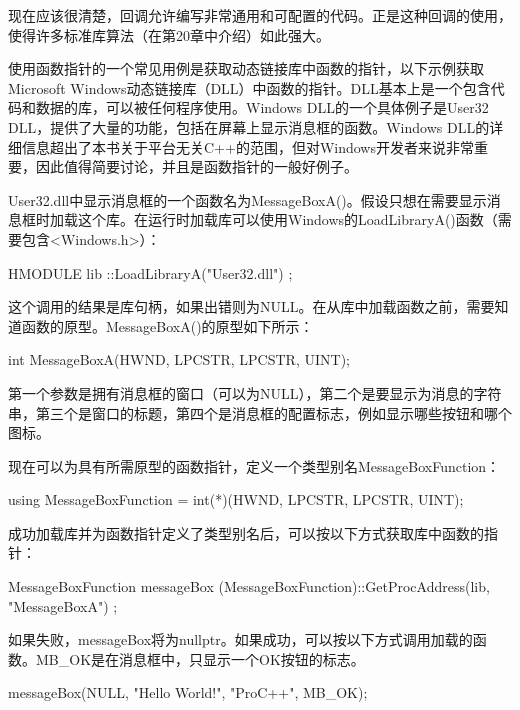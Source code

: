 现在应该很清楚，回调允许编写非常通用和可配置的代码。正是这种回调的使用，使得许多标准库算法（在第20章中介绍）如此强大。


使用函数指针的一个常见用例是获取动态链接库中函数的指针，以下示例获取Microsoft Windows动态链接库（DLL）中函数的指针。DLL基本上是一个包含代码和数据的库，可以被任何程序使用。Windows DLL的一个具体例子是User32 DLL，提供了大量的功能，包括在屏幕上显示消息框的函数。Windows DLL的详细信息超出了本书关于平台无关C++的范围，但对Windows开发者来说非常重要，因此值得简要讨论，并且是函数指针的一般好例子。

User32.dll中显示消息框的一个函数名为MessageBoxA()。假设只想在需要显示消息框时加载这个库。在运行时加载库可以使用Windows的LoadLibraryA()函数（需要包含<Windows.h>）：

\begin{cpp}
HMODULE lib { ::LoadLibraryA("User32.dll") };
\end{cpp}

这个调用的结果是库句柄，如果出错则为NULL。在从库中加载函数之前，需要知道函数的原型。MessageBoxA()的原型如下所示：

\begin{cpp}
int MessageBoxA(HWND, LPCSTR, LPCSTR, UINT);
\end{cpp}

第一个参数是拥有消息框的窗口（可以为NULL），第二个是要显示为消息的字符串，第三个是窗口的标题，第四个是消息框的配置标志，例如显示哪些按钮和哪个图标。

现在可以为具有所需原型的函数指针，定义一个类型别名MessageBoxFunction：

\begin{cpp}
using MessageBoxFunction = int(*)(HWND, LPCSTR, LPCSTR, UINT);
\end{cpp}

成功加载库并为函数指针定义了类型别名后，可以按以下方式获取库中函数的指针：

\begin{cpp}
MessageBoxFunction messageBox {
    (MessageBoxFunction)::GetProcAddress(lib, "MessageBoxA") };
\end{cpp}

如果失败，messageBox将为nullptr。如果成功，可以按以下方式调用加载的函数。MB\_OK是在消息框中，只显示一个OK按钮的标志。

\begin{cpp}
messageBox(NULL, "Hello World!", "ProC++", MB_OK);
\end{cpp}












